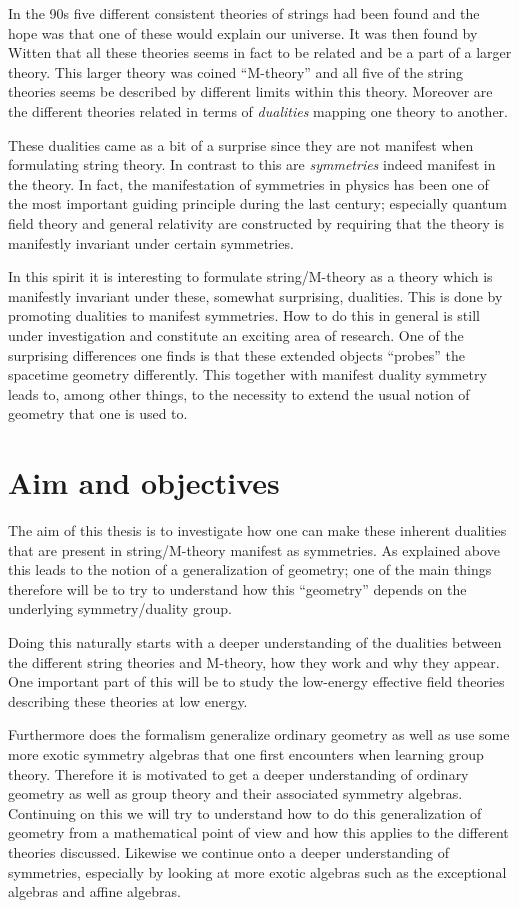 \documentclass{article}
\begin{document}
In the 90s five different consistent theories of strings had been found and the hope was that one of these would explain our universe. It was then found by Witten \cite{Witten1995} that all these theories seems in fact to be related and be a part of a larger theory. This larger theory was coined ``M-theory'' and all five of the string theories seems be described by different limits within this theory. Moreover are the different theories related in terms of \emph{dualities} mapping one theory to another. 

These dualities came as a bit of a surprise since they are not manifest when formulating string theory. In contrast to this are \emph{symmetries} indeed manifest in the theory. In fact, the manifestation of symmetries in physics has been one of the most important guiding principle during the last century; especially quantum field theory and general relativity are constructed by requiring that the theory is manifestly invariant under certain symmetries. 

In this spirit it is interesting to formulate string/M-theory as a theory which is manifestly invariant under these, somewhat surprising, dualities. This is done by promoting dualities to manifest symmetries. How to do this in general is still under investigation and constitute an exciting area of research. One of the surprising differences one finds is that these extended objects ``probes'' the spacetime geometry differently. This together with manifest duality symmetry leads to, among other things, to the necessity to extend the usual notion of geometry that one is used to. 


\section*{Aim and objectives}
The aim of this thesis is to investigate how one can make these inherent dualities that are present in string/M-theory manifest as symmetries. As explained above this leads to the notion of a generalization of geometry; one of the main things therefore will be to try to understand how this ``geometry'' depends on the underlying symmetry/duality group.

Doing this naturally starts with a deeper understanding of the dualities between the different string theories and M-theory, how they work and why they appear. One important part of this will be to study the low-energy effective field theories describing these theories at low energy. 

Furthermore does the formalism generalize ordinary geometry as well as use some more exotic symmetry algebras that one first encounters when learning group theory. Therefore it is motivated to get a deeper understanding of ordinary geometry as well as group theory and their associated symmetry algebras. Continuing on this we will try to understand how to do this generalization of geometry from a mathematical point of view and how this applies to the different theories discussed. Likewise we continue onto a deeper understanding of symmetries, especially by looking at more exotic algebras such as the exceptional algebras and affine algebras. 
\end{document}
